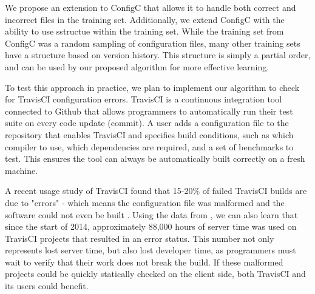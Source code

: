 We propose an extension to ConfigC that allows it to handle both correct and incorrect files in the training set.
Additionally, we extend ConfigC with the ability to use sstructue within the training set.
While the training set from ConfigC was a random sampling of configuration files, many other training sets have a structure based on version history.
This structure is simply a partial order, and can be used by our proposed algorithm for more effective learning.

To test this approach in practice, we plan to implement our algorithm to check for TravisCI configuration errors.
TravisCI is a continuous integration tool connected to Github that allows programmers to automatically run their test suite on every code update (commit).
A user adds a configuration file to the repository that enables TravisCI and specifies build conditions, such as which compiler to use, which dependencies are required, and a set of benchmarks to test.
This ensures the tool can always be automatically built correctly on a fresh machine.

A recent usage study of TravisCI found that 15-20\% of failed TravisCI builds are due to "errors" - which means the configuration file was malformed and the software could not even be built \cite{API}.
Using the data from \cite{API}, we can also learn that since the start of 2014, approximately 88,000 hours of server time was used on TravisCI projects that resulted in an error status.
This number not only represents lost server time, but also lost developer time, as programmers must wait to verify that their work does not break the build.
If these malformed projects could be quickly statically checked on the client side, both TravisCI and its users could benefit.
